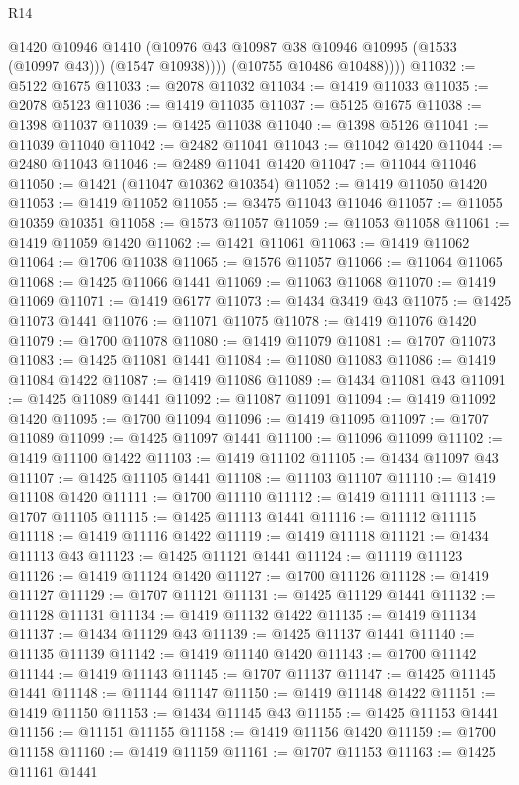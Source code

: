 \begin{lexlean}{R14}
\begin{coremodule}
                @1420
                @10946
                @1410
                (@10976 @43 @10987 @38 @10946 @10995 (@1533 (@10997 @43)))
                (@1547 @10938))))
          (@10755 @10486 @10488))))
@11032 := @5122 @1675
@11033 := @2078 @11032
@11034 := @1419 @11033
@11035 := @2078 @5123
@11036 := @1419 @11035
@11037 := @5125 @1675
@11038 := @1398 @11037
@11039 := @1425 @11038
@11040 := @1398 @5126
@11041 := @11039 @11040
@11042 := @2482 @11041
@11043 := @11042 @1420
@11044 := @2480 @11043
@11046 := @2489 @11041 @1420
@11047 := @11044 @11046
@11050 := @1421 (@11047 @10362 @10354)
@11052 := @1419 @11050 @1420
@11053 := @1419 @11052
@11055 := @3475 @11043 @11046
@11057 := @11055 @10359 @10351
@11058 := @1573 @11057
@11059 := @11053 @11058
@11061 := @1419 @11059 @1420
@11062 := @1421 @11061
@11063 := @1419 @11062
@11064 := @1706 @11038
@11065 := @1576 @11057
@11066 := @11064 @11065
@11068 := @1425 @11066 @1441
@11069 := @11063 @11068
@11070 := @1419 @11069
@11071 := @1419 @6177
@11073 := @1434 @3419 @43
@11075 := @1425 @11073 @1441
@11076 := @11071 @11075
@11078 := @1419 @11076 @1420
@11079 := @1700 @11078
@11080 := @1419 @11079
@11081 := @1707 @11073
@11083 := @1425 @11081 @1441
@11084 := @11080 @11083
@11086 := @1419 @11084 @1422
@11087 := @1419 @11086
@11089 := @1434 @11081 @43
@11091 := @1425 @11089 @1441
@11092 := @11087 @11091
@11094 := @1419 @11092 @1420
@11095 := @1700 @11094
@11096 := @1419 @11095
@11097 := @1707 @11089
@11099 := @1425 @11097 @1441
@11100 := @11096 @11099
@11102 := @1419 @11100 @1422
@11103 := @1419 @11102
@11105 := @1434 @11097 @43
@11107 := @1425 @11105 @1441
@11108 := @11103 @11107
@11110 := @1419 @11108 @1420
@11111 := @1700 @11110
@11112 := @1419 @11111
@11113 := @1707 @11105
@11115 := @1425 @11113 @1441
@11116 := @11112 @11115
@11118 := @1419 @11116 @1422
@11119 := @1419 @11118
@11121 := @1434 @11113 @43
@11123 := @1425 @11121 @1441
@11124 := @11119 @11123
@11126 := @1419 @11124 @1420
@11127 := @1700 @11126
@11128 := @1419 @11127
@11129 := @1707 @11121
@11131 := @1425 @11129 @1441
@11132 := @11128 @11131
@11134 := @1419 @11132 @1422
@11135 := @1419 @11134
@11137 := @1434 @11129 @43
@11139 := @1425 @11137 @1441
@11140 := @11135 @11139
@11142 := @1419 @11140 @1420
@11143 := @1700 @11142
@11144 := @1419 @11143
@11145 := @1707 @11137
@11147 := @1425 @11145 @1441
@11148 := @11144 @11147
@11150 := @1419 @11148 @1422
@11151 := @1419 @11150
@11153 := @1434 @11145 @43
@11155 := @1425 @11153 @1441
@11156 := @11151 @11155
@11158 := @1419 @11156 @1420
@11159 := @1700 @11158
@11160 := @1419 @11159
@11161 := @1707 @11153
@11163 := @1425 @11161 @1441

\end{coremodule}
\end{lexlean}
